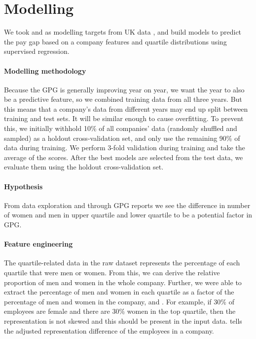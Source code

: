 \section{Modelling}
\label{sec:modelling}
We took  and   as modelling targets from UK data \cite{gov-uk-gpg-data}, and build models to
predict the pay gap based on a company features and quartile distributions using supervised regression.  

\paragraph{Modelling methodology}
Because the GPG is generally improving year on year,
we want the year to also be a predictive feature, so we combined training data from all three years. But this means that a company's data from different years may end up split between training and test sets. It will  be similar enough to cause overfitting. To prevent this, we initially withhold 10\% of all companies' data (randomly shuffled and sampled) as a holdout cross-validation set, and only use the remaining 90\% of data during training. We perform 3-fold validation during training and take the average of the scores. After the best models are selected from the test data, we evaluate them using the holdout cross-validation set. 

\paragraph*{Hypothesis} From data exploration and through GPG reports we see the difference in number of women and men in upper quartile and lower quartile to be a potential factor in GPG.

\paragraph*{Feature engineering} The quartile-related data in the raw dataset represents the percentage of each quartile that were men or women. From this, we can derive the relative proportion of men and women in the whole company.
Further, we were able to extract the percentage of men and women in each quartile as a factor of the percentage of men and women in the company,  and . For example, if 30\% of employees are female and there are 30\% women in the top quartile, then the representation is not skewed and this should be present in the input data.
 tells the adjusted representation difference of the employees in a company.

